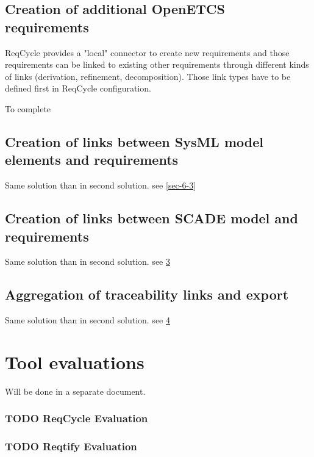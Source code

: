 \documentclass[11pt]{template/openetcs_report}
\begin{document}
\section{Creation of additional OpenETCS requirements}
\label{sec-7-2}
ReqCycle provides a "local" connector to create new requirements and those requirements can be linked to existing other requirements through different kinds of links (derivation, refinement, decomposition). Those link types have to be defined first in ReqCycle configuration.

To complete

\section{Creation of links between SysML model elements and requirements}
\label{sec-7-3}
Same solution than in second solution. see \ref{sec-6-3}

\section{Creation of links between SCADE model and requirements}
\label{sec-6-4}
Same solution than in second solution. see \ref{sec-6-4}

\section{Aggregation of traceability links and export}
\label{sec-6-5}
Same solution than in second solution. see \ref{sec-6-5}



\chapter{Tool evaluations}
Will be done in a separate document.
\subsection{{\bfseries\sffamily TODO} ReqCycle  Evaluation}
\label{sec-4-5}
\subsection{{\bfseries\sffamily TODO} Reqtify Evaluation}
\label{sec-4-6}





\end{document}
